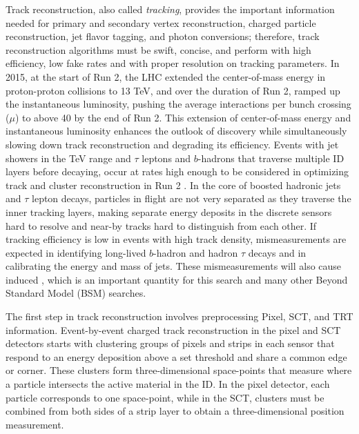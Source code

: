 Track reconstruction, also called \textit{tracking}, provides the important information needed for primary and secondary vertex reconstruction, charged particle reconstruction, jet flavor tagging, and photon conversions; therefore, track reconstruction algorithms must be swift, concise, and perform with high efficiency, low fake rates and with proper resolution on tracking parameters.  In 2015, at the start of Run 2, the LHC extended the center-of-mass energy in proton-proton collisions to 13 TeV, and over the duration of Run 2, ramped up the instantaneous luminosity, pushing the average interactions per bunch crossing ($\mu$) to above 40 by the end of Run 2.  This extension of center-of-mass energy and instantaneous luminosity enhances the outlook of discovery while simultaneously slowing down track reconstruction and degrading its efficiency.  Events with jet showers in the TeV range and $\tau$ leptons and $b$-hadrons that traverse multiple ID layers before decaying, occur at rates high enough to be considered in optimizing track and cluster reconstruction in Run 2 \cite{aad}.  In the core of boosted hadronic jets and $\tau$ lepton decays, particles in flight are not very separated as they traverse the inner tracking layers, making separate energy deposits in the discrete sensors hard to resolve and near-by tracks hard to distinguish from each other.  If tracking efficiency is low in events with high track density, mismeasurements are expected in identifying long-lived $b$-hadron and hadron $\tau$ decays and in calibrating the energy and mass of jets.  These mismeasurements will also cause induced \met, which is an important quantity for this search and many other Beyond Standard Model (BSM) searches.  

The first step in track reconstruction involves preprocessing Pixel, SCT, and TRT information. Event-by-event charged track reconstruction in the pixel and SCT detectors starts with clustering groups of pixels and strips in each sensor that respond to an energy deposition above a set threshold and share a common edge or corner.  These clusters form three-dimensional space-points that measure where a particle intersects the active material in the ID.  In the pixel detector, each particle corresponds to one space-point, while in the SCT, clusters must be combined from both sides of a strip layer to obtain a three-dimensional position measurement.  %

